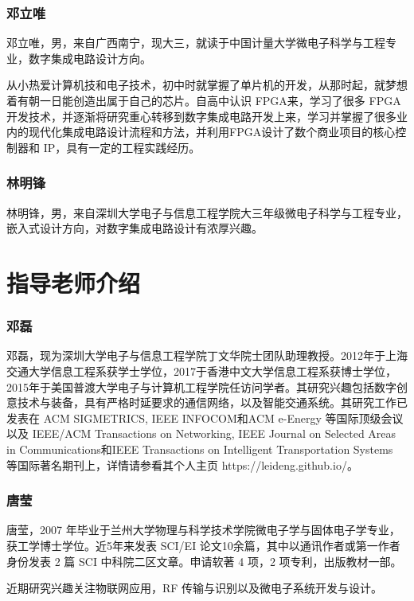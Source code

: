 \documentclass[12pt, a4paper, oneside]{ctexbook}
\begin{document}
	\subsubsection{邓立唯}
	邓立唯，男，来自广西南宁，现大三，就读于中国计量大学微电子科学与工程专业，数字集成电路设计方向。\par
	从小热爱计算机技和电子技术，初中时就掌握了单片机的开发，从那时起，就梦想着有朝一日能创造出属于自己的芯片。自高中认识 FPGA来，学习了很多 FPGA 开发技术，并逐渐将研究重心转移到数字集成电路开发上来，学习并掌握了很多业内的现代化集成电路设计流程和方法，并利用FPGA设计了数个商业项目的核心控制器和 IP，具有一定的工程实践经历。\par
	\subsubsection{林明锋}
	林明锋，男，来自深圳大学电子与信息工程学院大三年级微电子科学与工程专业，嵌入式设计方向，对数字集成电路设计有浓厚兴趣。
	
	\section{指导老师介绍}
	\subsubsection{邓磊}
	邓磊，现为深圳大学电子与信息工程学院丁文华院士团队助理教授。2012年于上海交通大学信息工程系获学士学位，2017于香港中文大学信息工程系获博士学位，2015年于美国普渡大学电子与计算机工程学院任访问学者。其研究兴趣包括数字创意技术与装备，具有严格时延要求的通信网络，以及智能交通系统。其研究工作已发表在 ACM SIGMETRICS, IEEE INFOCOM和ACM e-Energy 等国际顶级会议以及 IEEE/ACM Transactions on Networking, IEEE Journal on Selected Areas in Communications和IEEE Transactions on Intelligent Transportation Systems 等国际著名期刊上，详情请参看其个人主页 https://leideng.github.io/。
	
	\subsubsection{唐莹}
	唐莹，2007 年毕业于兰州大学物理与科学技术学院微电子学与固体电子学专业，获工学博士学位。近5年来发表 SCI/EI 论文10余篇，其中以通讯作者或第一作者身份发表 2 篇 SCI 中科院二区文章。申请软著 4 项，2 项专利，出版教材一部。\par 近期研究兴趣关注物联网应用，RF 传输与识别以及微电子系统开发与设计。
	
	
	
\end{document}
